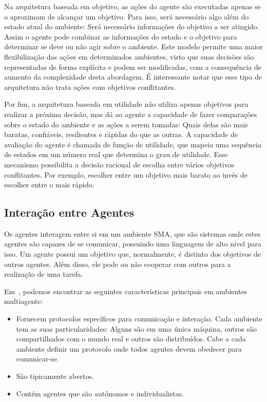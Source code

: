 Na arquitetura baseada em objetivo, as ações do agente são executadas apenas se o aproximam de alcançar um objetivo. Para isso, será necessário algo além do estado atual do ambiente: Será necessário informações do objetivo a ser atingido. Assim o agente pode combinar as informações do estado e o objetivo para determinar se deve ou não agir sobre o ambiente. Este modelo permite uma maior flexibilização das ações em determinados ambientes, visto que suas decisões são representadas de forma explícita e podem ser modificadas, com a consequência de aumento da complexidade desta abordagem. É interessante notar que esse tipo de arquitetura não trata ações com objetivos conflitantes.

Por fim, a arquitetura baseada em utilidade não utiliza apenas objetivos para realizar a próxima decisão, mas dá ao agente a capacidade de fazer comparações sobre o estado do ambiente e as ações a serem tomadas: Quais delas são mais baratas, confiáveis, resilientes e rápidas do que as outras. A capacidade de avaliação do agente é chamada de função de utilidade, que mapeia uma sequência de estados em um número real que determina o grau de utilidade. Esse mecanismo possibilita a decisão racional de escolha entre vários objetivos conflitantes. Por exemplo, escolher entre um objetivo mais barato ao invés de escolher entre o mais rápido.

\subsection{Interação entre Agentes}

Os agentes interagem entre si em um ambiente SMA, que são sistemas onde estes agentes são capazes de se comunicar, possuindo uma linguagem de alto nível para isso. Um agente possui um objetivo que, normalmente, é distinto dos objetivos de outros agentes. Além disso, ele pode ou não cooperar com outros para a realização de uma tarefa.

Em~\cite{sarmento11}, podemos encontrar as seguintes características principais em ambientes multiagente:
\begin{itemize}
	\item Fornecem protocolos específicos para comunicação e interação. Cada ambiente tem as suas particularidades: Alguns são em uma única máquina, outros são compartilhados com o mundo real e outros são distribuídos. Cabe a cada ambiente definir um protocolo onde todos agentes devem obedecer para comunicar-se.
	\item São tipicamente abertos.
	\item Contém agentes que são autônomos e individualistas.
\end{itemize}

